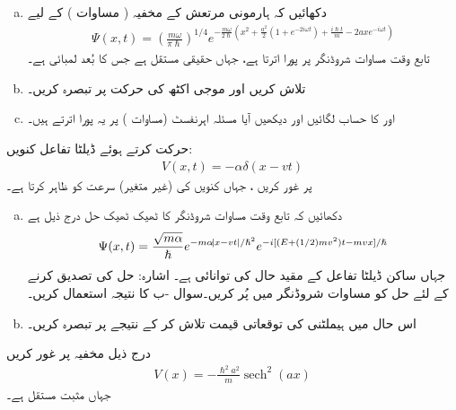 \begin{enumerate}[a.]
\item
 دکھائیں کہ ہارمونی مرتعش کے  مخفیہ  ( مساوات ) کے لیے
\begin{align*}
	\Psi(x, t)=\left(\frac{m\omega}{\pi\hslash}\right)^{1/4}e^{-\frac{m\omega}{2\hslash}\left(x^2+\frac{a^2}{2}(1+e^{-2i\omega t})+\frac{i\hslash t}{m}-2axe^{-i\omega t}\right)}
\end{align*}
 تابع وقت مساوات شروڈنگر پر پورا اترتا ہے،  جہاں    حقیقی مستقل ہے جس کا بُعد لمبائی ہے۔
\item
   تلاش کریں اور موجی اکٹھ کی حرکت پر تبصرہ کریں۔
\item
  اور  کا حساب لگائیں اور دیکھیں آیا مسئلہ اہرنفسٹ (مساوات )  پر یہ پورا اترتے ہیں۔
\end{enumerate}
 حرکت کرتے ہوئے   ڈیلٹا تفاعل کنویں:
\begin{align*}
	V(x, t)=-\alpha\delta(x-v t)
\end{align*}
 پر غور کریں ، جہاں کنویں کی   (غیر متغیر)  سرعت کو  ظاہر کرتا ہے۔
\begin{enumerate}[a.]
\item
 دکھائیں کہ تابع وقت مساوات شروڈنگر کا  ٹھیک ٹھیک حل درج ذیل ہے
\begin{align*}
	\Psi(x, t)=\frac{\sqrt{m\alpha}}{\hslash}e^{-m\alpha\abs{x-v t}/\hslash^2}e^{-i[(E+(1/2)m v^2)t-m v x]/\hslash}
\end{align*}
جہاں   ساکن ڈیلٹا تفاعل کے مقید حال کی توانائی ہے۔ اشارہ: حل  کی تصدیق کرنے کے لئے حل کو مساوات شروڈنگر میں   پُر کریں۔سوال -ب کا نتیجہ استعمال کریں۔
\item
 اس حال میں ہیملٹنی کی توقعاتی قیمت تلاش کر کے نتیجے پر تبصرہ کریں۔
\end{enumerate}
درج ذیل مخفیہ پر غور کریں 
\begin{align*}
	V(x)=-\frac{\hslash^2a^2}{m}\operatorname{sech}^2(ax)
\end{align*}
جہاں    مثبت مستقل ہے۔
